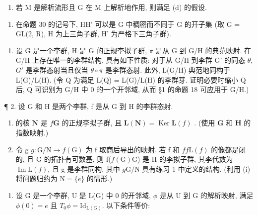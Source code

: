 \begin{enumerate}
\def\labelenumi{(\alph{enumi})}
\setcounter{enumi}{4}
\tightlist
\item
  若 M 是解析流形且 G 在 M 上解析地作用, 则满足 (d) 的假设.
\end{enumerate}

\begin{enumerate}
\def\labelenumi{\arabic{enumi}.}
\setcounter{enumi}{8}
\tightlist
\item
  在命题 30 的记号下, HH' 可以是 G 中稠密而不同于 G 的开子集 (取 G = GL(2, R), H 为上三角子群, H' 为严格下三角子群).
\end{enumerate}


\begin{enumerate}
\def\labelenumi{\arabic{enumi}.}
\tightlist
\item
  设 G 是一个李群, H 是 G 的正规李拟子群, \(\pi\) 是从 G 到 G/H 的典范映射. 在 G/H 上存在唯一的李群结构, 具有如下性质: 对于从 G/H 到李群 G' 的同态 \(\theta\), \(G'\) 是李群态射当且仅当 \(\theta \circ \pi\) 是李群态射. 此外, L(G/H) 典范地同构于 L(G)/L(H). (令 Q 为满足 L(Q) = L(G)/L(H) 的李群芽. 证明必要时缩小 Q 后, Q 可识别为 G/H 中 0 的一个开邻域, 从而 §1 的命题 18 可应用于 G/H.)
\end{enumerate}

¶ 2. 设 G 和 H 是两个李群, f 是从 G 到 H 的李群态射.

\begin{enumerate}
\def\labelenumi{(\roman{enumi})}
\item
   的核 \(\mathbf{N}\) 是 \(f\)\(\mathbf{G}\) 的正规李拟子群, 且 \(\mathbf{L}(\mathbf{N}) = \operatorname{Ker} \mathbf{L}(f)\) . (使用 \(\mathbf{G}\) 和 \(\mathbf{H}\) 的指数映射.)
\item
  令 g \(g \colon \mathrm{G} / \mathrm{N} \to f(\mathrm{G})\) 为 f 取商后导出的映射. 若 f 和 \(f\)\(f\)\(\mathrm{L}(f)\) 的像都是闭的, 且 \(\mathrm{G}\) 的拓扑有可数基, 则 f(\(f(\mathrm{G})\)G) 是 \(\mathrm{H}\) 的李拟子群, 其李代数为 \(\operatorname{Im} \mathrm{L}(f)\), 且 g 是李群同构, 其中 \(g\)\(\mathrm{G} / \mathrm{N}\) 具有练习 1 中定义的结构. (利用 (i) 将问题归约为 \(\mathrm{N} = \{e\}\) 的情形.)
\end{enumerate}

\begin{enumerate}
\def\labelenumi{\arabic{enumi}.}
\setcounter{enumi}{2}
\tightlist
\item
  设 G 是一个李群, U 是 L(G) 中 0 的开邻域, \(\phi\) 是从 U 到 G 的解析映射, 满足 \(\phi(0) = e\) 且 \(T_{0}\phi = \mathrm{Id}_{\mathrm{L}(G)}\). 以下条件等价:
\end{enumerate}

